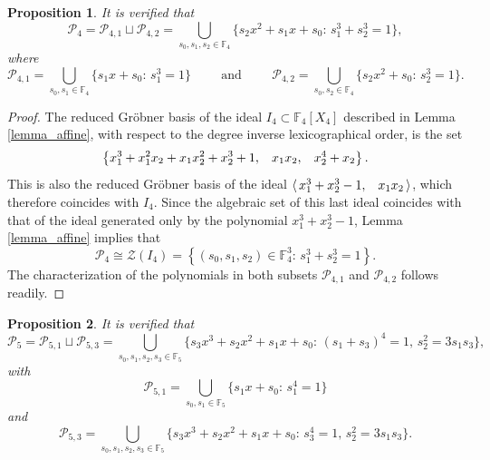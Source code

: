 \documentclass[pdflatex,sn-mathphys-num]{sn-jnl}
\theoremstyle{thmstyleone}%
\newtheorem{proposition}{Proposition}[section]
\begin{document}
\begin{proposition}\label{proposition_P4} It is verified that
\[\mathcal{P}_4=\mathcal{P}_{4,1}\sqcup \mathcal{P}_{4,2}=\bigcup_{s_0,s_1,s_2\in\mathbb{F}_4}\{s_2x^2+s_1x+s_0\colon\,s_1^3+s_2^3=1\},\]
where
\[\mathcal{P}_{4,1}=\bigcup_{s_0,s_1\in\mathbb{F}_4}\{s_1x+s_0\colon\, s_1^3=1\} \hspace{1cm}\text{and}\hspace{1cm}
\mathcal{P}_{4,2}=\bigcup_{s_0,s_2\in\mathbb{F}_4}\{s_2x^2+s_0\colon\, s_2^3=1\}.\]
\end{proposition}

\begin{proof} The reduced Gr\"obner basis of the ideal $I_4\subset \mathbb{F}_4[X_4]$ described in Lemma \ref{lemma_affine}, with respect to the degree inverse lexicographical order, is the set
\begin{equation}\label{equation_G4}
\left\{x_1^3 + x_1^2 x_2 + x_1x_2^2 + x_2^3 + 1,\hspace{0.3cm}x_1x_2,\hspace{0.3cm} x_2^4+x_2\right\}.
\end{equation}
This is also the reduced Gr\"obner basis of the ideal $\langle\, x_1^3+x_2^3-1,\hspace{0.3cm}x_1x_2\,\rangle$, which therefore coincides with $I_4$. Since the algebraic set of this last ideal coincides with that of the ideal generated only by the polynomial $x_1^3+x_2^3-1$, Lemma \ref{lemma_affine} implies that
\[\mathcal{P}_4\cong\mathcal{Z}(I_4)=\left\{(s_0,s_1,s_2)\in\mathbb{F}_4^3\colon\,s_1^3+s_2^3=1\right\}.\]
The characterization of the polynomials in both subsets $\mathcal{P}_{4,1}$ and $\mathcal{P}_{4,2}$ follows readily.
\end{proof}

\vspace{0.2cm}

\begin{proposition}\label{proposition_P5} It is verified that
\[\mathcal{P}_5=\mathcal{P}_{5,1}\sqcup \mathcal{P}_{5,3}=\bigcup_{s_0,s_1,s_2,s_3\in\mathbb{F}_5}\{s_3x^3+s_2x^2+s_1x+s_0\colon\, (s_1+s_3)^4=1,\, s_2^2=3s_1s_3\},\]
with
\[\mathcal{P}_{5,1}=\bigcup_{s_0,s_1\in\mathbb{F}_5}\{s_1x+s_0\colon\, s_1^4=1\}\]
and
\[\mathcal{P}_{5,3}=\bigcup_{s_0,s_1,s_2,s_3\in\mathbb{F}_5}\{s_3x^3+s_2x^2+s_1x+s_0\colon\, s_3^4=1,\, s_2^2=3s_1s_3\}.\]
\end{proposition}
\end{document}
